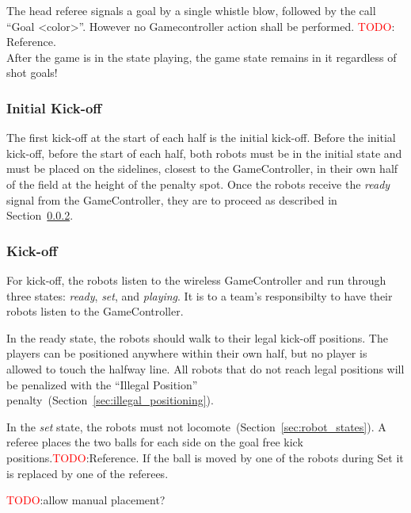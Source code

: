 
The head referee signals a goal by a single whistle blow, followed by the call ``Goal \textless color\textgreater''. However no Gamecontroller action shall be performed. \textcolor{red}{TODO}: Reference. \\
After the game is in the state playing, the game state remains in it regardless of shot goals!


\subsubsection{Initial Kick-off}
\label{sec:initial-kick-off}

The first kick-off at the start of each half is the initial kick-off.
Before the initial kick-off, \ie before the start of each half, both robots must be in the initial state and must be placed on the sidelines, closest to the GameController, in their own half of the field at the height of the penalty spot. 
Once the robots receive the \emph{ready} signal from the GameController, they are to proceed as described in Section~\ref{sec:kick-off}.

\subsubsection{Kick-off}
\label{sec:kick-off}
For kick-off, the robots listen to the wireless GameController and run through three states: \emph{ready}, \emph{set}, and \emph{playing}. It is to a team's responsibilty to have their robots listen to the GameController.

In the ready state, the robots should walk to their legal kick-off positions.
The players can be positioned anywhere within their own half, but no player is allowed to touch the halfway line. All robots that do not reach legal positions will be penalized with the ``Illegal Position'' penalty~(\cf Section~\ref{sec:illegal_positioning}).

In the \emph{set} state, the robots must not locomote~(\cf Section~\ref{sec:robot_states}). A referee places the two balls for each side on the goal free kick positions.\textcolor{red}{TODO}:Reference. If the ball is moved by one of the robots during Set it is replaced by one of the referees.

\textcolor{red}{TODO}:allow manual placement?

